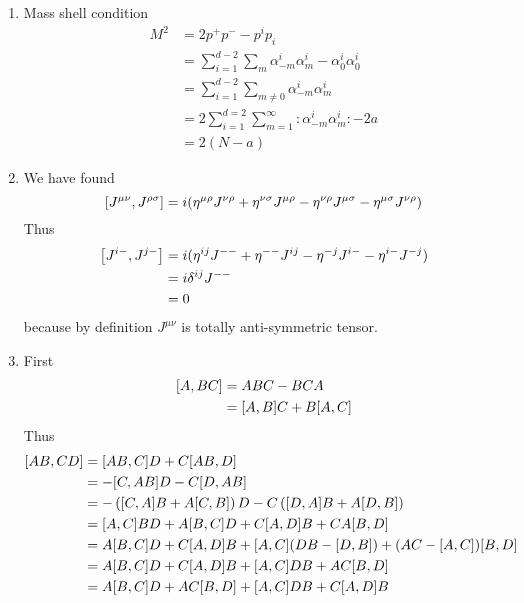 \begin{enumerate}[label=(\alph*)]
	\item Mass shell condition
		\begin{align*}
			M^2 &= 2p^+p^- - p^i p_i \\
				 &= \sum_{i=1}^{d-2} \sum_m \alpha_{-m}^i \alpha_{m}^i - \alpha^i_0 \alpha^i_0 \\
				 &= \sum_{i=1}^{d-2} \sum_{m \neq 0} \alpha_{-m}^i \alpha_{m}^i \\
				 &= 2 \sum_{i=1}^{d=2} \sum_{m=1}^{\infty} :\alpha^i_{-m} \alpha^i_{m}: - 2 a \\
				 &= 2 (N-a)
		\end{align*}
	\item 
		We have found 
		\begin{equation}
			\comm{J^{\mu\nu}}{J^{\rho\sigma}} = i (\eta^{\mu \rho} J^{\nu\rho} + \eta^{\nu\sigma} J^{\mu\rho} - \eta^{\nu\rho} J^{\mu\sigma} - \eta^{\mu\sigma} J^{\nu\rho})
		\end{equation}
		Thus
		\begin{align*}
			\comm{J^{i-}}{J^{j-}} &= i (\eta^{i j} J^{--} + \eta^{--} J^{ij} - \eta^{-j} J^{i-} - \eta^{i-} J^{-j}) \\
										 &= i \delta^{ij} J^{--} \\
										 &= 0
		\end{align*}
		because by definition $J^{\mu\nu}$ is totally anti-symmetric tensor.

	\item First
		\begin{align*}
			\comm{A}{BC} &= ABC - BCA \\
							 &= \comm{A}{B}C + B\comm{A}{C}
		\end{align*}
		Thus
		\begin{align*}
			\comm{AB}{CD} &= \comm{AB}{C} D + C \comm{AB}{D} \\
							  &= -\comm{C}{AB} D - C \comm{D}{AB} \\
							  &= -\left(\comm{C}{A}B + A \comm{C}{B} \right) D - C \left(\comm{D}{A}B + A \comm{D}{B} \right) \\
							  &= \comm{A}{C}BD + A \comm{B}{C} D + C\comm{A}{D} B + C A \comm{B}{D} \\
							  &= A \comm{B}{C} D + C\comm{A}{D} B + \comm{A}{C} (DB - \comm{D}{B}) + (AC - \comm{A}{C})\comm{B}{D}\\ 
							  &= A \comm{B}{C} D + C\comm{A}{D} B + \comm{A}{C} DB + AC \comm{B}{D} \\
							  &= A \comm{B}{C} D + AC \comm{B}{D}  + \comm{A}{C} DB + C\comm{A}{D} B
		\end{align*}


\end{enumerate}
